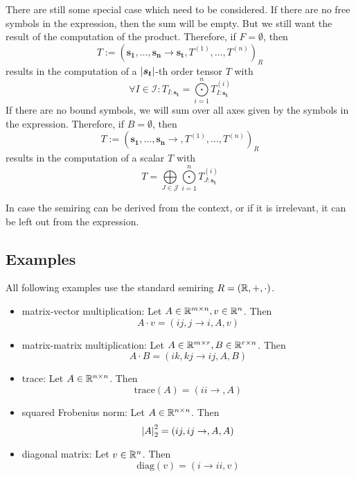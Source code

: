 \begin{definition}
    There are still some special case which need to be considered.
    If there are no free symbols in the expression, then the sum will be empty.
    But we still want the result of the computation of the product.
    Therefore, if $F = \emptyset$, then
    $$T := (\bm{s_1},\dots,\bm{s_n} \rightarrow \bm{s_t}, T^{(1)},\dots,T^{(n)})_R$$
    results in the computation of a $\left| \bm{s_t} \right|$-th order tensor $T$ with
    $$\forall I \in \mathcal{I}: T_{I: \bm{s_t}} = \bigodot\limits_{i = 1}^{n} T^{(i)}_{I:\bm{s_t}}$$
    If there are no bound symbols, we will sum over all axes given by the symbols in the expression.
    Therefore, if $B = \emptyset$, then
    $$T := (\bm{s_1},\dots,\bm{s_n} \rightarrow , T^{(1)},\dots,T^{(n)})_R$$
    results in the computation of a scalar $T$ with
    $$T = \bigoplus\limits_{J \in \mathcal{J}} \bigodot\limits_{i = 1}^{n} T^{(i)}_{J:\bm{s_t}}$$

    In case the semiring can be derived from the context, or if it is irrelevant, it can be left out from the expression.
\end{definition}

\subsection{Examples}
All following examples use the standard semiring $R = (\mathbb{R}, +, \cdot)$.
\begin{itemize}
    \item matrix-vector multiplication: Let $A \in \mathbb{R}^{m \times n}, v \in \mathbb{R}^{n}$. Then
          $$A \cdot v = (ij, j \rightarrow i, A, v)$$
    \item matrix-matrix multiplication: Let $A \in \mathbb{R}^{m \times r}, B \in \mathbb{R}^{r \times n}$. Then
          $$A \cdot B = (ik, kj \rightarrow ij, A, B)$$
    \item trace: Let $A \in \mathbb{R}^{n \times n}$. Then
          $$\text{trace}(A) = (ii \rightarrow, A)$$
    \item squared Frobenius norm: Let $A \in \mathbb{R}^{n \times n}$. Then
          $$\left| A \right|_2^2 = (ij, ij \rightarrow,A,A)$$
    \item diagonal matrix: Let $v \in \mathbb{R}^{n}$. Then
          $$\text{diag}(v) = (i \rightarrow ii, v)$$
\end{itemize}

